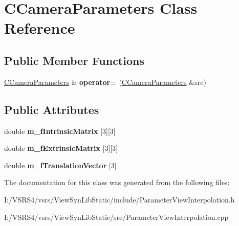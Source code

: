 \hypertarget{class_c_camera_parameters}{}\section{C\+Camera\+Parameters Class Reference}
\label{class_c_camera_parameters}
\subsection*{Public Member Functions}
\begin{DoxyCompactItemize}
\item 
\mbox{\label{class_c_camera_parameters_a25de1172a4d134445f5c5476118779f4}} 
\hyperlink{class_c_camera_parameters}{C\+Camera\+Parameters} \& {\bfseries operator=} (\hyperlink{class_c_camera_parameters}{C\+Camera\+Parameters} \&src)
\end{DoxyCompactItemize}
\subsection*{Public Attributes}
\begin{DoxyCompactItemize}
\item 
\mbox{\label{class_c_camera_parameters_ae046aaf6bf0df3af882cb522f36b862e}} 
double {\bfseries m\+\_\+f\+Intrinsic\+Matrix} \mbox{[}3\mbox{]}\mbox{[}3\mbox{]}
\item 
\mbox{\label{class_c_camera_parameters_a0fe631ae7662c4b5055ac2a891f2f37f}} 
double {\bfseries m\+\_\+f\+Extrinsic\+Matrix} \mbox{[}3\mbox{]}\mbox{[}3\mbox{]}
\item 
\mbox{\label{class_c_camera_parameters_a5f6975ddcd3a04733ee89153e318b648}} 
double {\bfseries m\+\_\+f\+Translation\+Vector} \mbox{[}3\mbox{]}
\end{DoxyCompactItemize}


The documentation for this class was generated from the following files\+:\begin{DoxyCompactItemize}
\item 
I\+:/\+V\+S\+R\+S4/vsrs/\+View\+Syn\+Lib\+Static/include/Parameter\+View\+Interpolation.\+h\item 
I\+:/\+V\+S\+R\+S4/vsrs/\+View\+Syn\+Lib\+Static/src/Parameter\+View\+Interpolation.\+cpp\end{DoxyCompactItemize}
